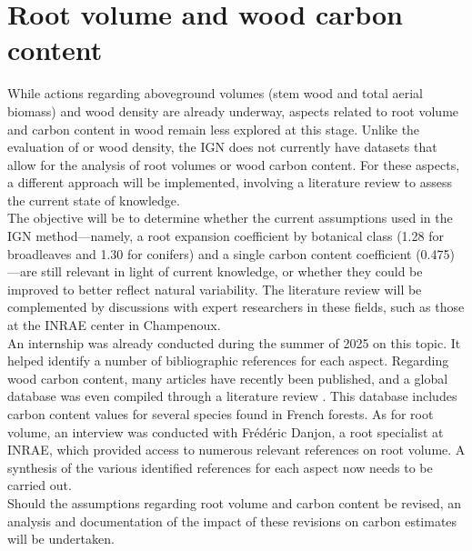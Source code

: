 \chapter{Root volume and wood carbon content}

While actions regarding aboveground volumes (stem wood and total aerial biomass) and wood density are already underway, aspects related to root volume and carbon content in wood remain less explored at this stage. Unlike the evaluation of or wood density, the IGN does not currently have datasets that allow for the analysis of root volumes or wood carbon content. For these aspects, a different approach will be implemented, involving a literature review to assess the current state of knowledge. \\

The objective will be to determine whether the current assumptions used in the IGN method---namely, a root expansion coefficient by botanical class (1.28 for broadleaves and 1.30 for conifers) and a single carbon content coefficient (0.475)---are still relevant in light of current knowledge, or whether they could be improved to better reflect natural variability. The literature review will be complemented by discussions with expert researchers in these fields, such as those at the INRAE center in Champenoux. \\

An internship was already conducted during the summer of 2025 on this topic. It helped identify a number of bibliographic references for each aspect. Regarding wood carbon content, many articles have recently been published, and a global database was even compiled through a literature review \parencite{Doraisami2022}. This database includes carbon content values for several species found in French forests. As for root volume, an interview was conducted with Frédéric Danjon, a root specialist at INRAE, which provided access to numerous relevant references on root volume. A synthesis of the various identified references for each aspect now needs to be carried out. \\

Should the assumptions regarding root volume and carbon content be revised, an analysis and documentation of the impact of these revisions on carbon estimates will be undertaken.